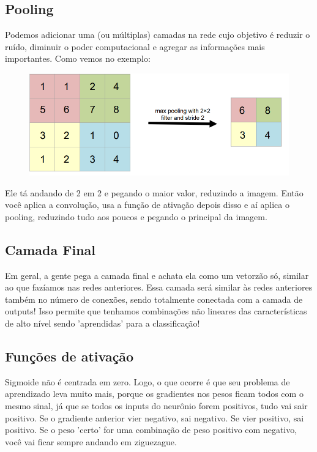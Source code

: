 \documentclass{article}
\begin{document}
\subsection{Pooling}
Podemos adicionar uma (ou múltiplas) camadas na rede cujo objetivo é reduzir o ruído, diminuir o poder computacional e agregar as informações mais importantes. Como vemos no exemplo:
\begin{figure}[h]
\includegraphics[scale = 0.5]{Pooling.PNG}

\end{figure}
Ele tá andando de 2 em 2 e pegando o maior valor, reduzindo a imagem. Então você aplica a convolução, usa a função de ativação depois disso e aí aplica o pooling, reduzindo tudo aos poucos e pegando o principal da imagem.

\subsection{Camada Final}
Em geral, a gente pega a camada final e achata ela como um vetorzão só, similar ao que fazíamos nas redes anteriores. Essa camada será similar às redes anteriores também no número de conexões, sendo totalmente conectada com a camada de outputs! Isso permite que tenhamos combinações não lineares das características de alto nível sendo 'aprendidas' para a classificação!

\subsection{Funções de ativação}
Sigmoide não é centrada em zero. Logo, o que ocorre é que seu problema de aprendizado leva muito mais, porque os gradientes nos pesos ficam todos com o mesmo sinal, já que se todos os inputs do neurônio forem positivos, tudo vai sair positivo. Se o gradiente anterior vier negativo, sai negativo. Se vier positivo, sai positivo. Se o peso 'certo' for uma combinação de peso positivo com negativo, você vai ficar sempre andando em ziguezague.
\end{document}
